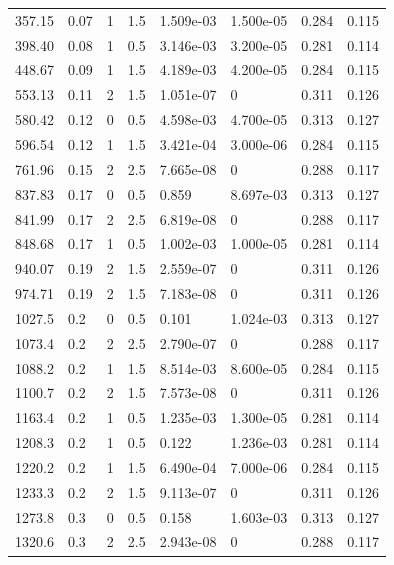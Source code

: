 \documentclass[preview]{standalone}
\begin{document}
{{\begin{tabular}{L{1.2cm}C{1.2cm} C{0.3cm}C{0.5cm} C{1.4cm}C{1.4cm} C{1.4cm}C{1.4cm}}
  357.15  &  0.07  & 1     & 1.5 &  1.509e-03  & 1.500e-05  & 0.284 &  0.115   \\ 
  398.40  &  0.08  & 1     & 0.5 &  3.146e-03  & 3.200e-05  & 0.281 &  0.114   \\ 
  448.67  &  0.09  & 1     & 1.5 &  4.189e-03  & 4.200e-05  & 0.284 &  0.115   \\ 
  553.13  &  0.11  & 2     & 1.5 &  1.051e-07  & 0  & 0.311 &  0.126   \\ 
  580.42  &  0.12  & 0     & 0.5 &  4.598e-03  & 4.700e-05  & 0.313 &  0.127   \\ 
  596.54  &  0.12  & 1     & 1.5 &  3.421e-04  & 3.000e-06  & 0.284 &  0.115   \\ 
  761.96  &  0.15  & 2     & 2.5 &  7.665e-08  & 0  & 0.288 &  0.117   \\ 
  837.83  &  0.17  & 0     & 0.5 &  0.859  & 8.697e-03  & 0.313 &  0.127   \\ 
  841.99  &  0.17  & 2     & 2.5 &  6.819e-08  & 0  & 0.288 &  0.117   \\ 
  848.68  &  0.17  & 1     & 0.5 &  1.002e-03  & 1.000e-05  & 0.281 &  0.114   \\ 
  940.07  &  0.19  & 2     & 1.5 &  2.559e-07  & 0  & 0.311 &  0.126   \\ 
  974.71  &  0.19  & 2     & 1.5 &  7.183e-08  & 0  & 0.311 &  0.126   \\ 
  1027.5  &   0.2  & 0     & 0.5 &  0.101  & 1.024e-03  & 0.313 &  0.127   \\ 
  1073.4  &   0.2  & 2     & 2.5 &  2.790e-07  & 0  & 0.288 &  0.117   \\ 
  1088.2  &   0.2  & 1     & 1.5 &  8.514e-03  & 8.600e-05  & 0.284 &  0.115   \\ 
  1100.7  &   0.2  & 2     & 1.5 &  7.573e-08  & 0  & 0.311 &  0.126   \\ 
  1163.4  &   0.2  & 1     & 0.5 &  1.235e-03  & 1.300e-05  & 0.281 &  0.114   \\ 
  1208.3  &   0.2  & 1     & 0.5 &  0.122  & 1.236e-03  & 0.281 &  0.114   \\ 
  1220.2  &   0.2  & 1     & 1.5 &  6.490e-04  & 7.000e-06  & 0.284 &  0.115   \\ 
  1233.3  &   0.2  & 2     & 1.5 &  9.113e-07  & 0  & 0.311 &  0.126   \\ 
  1273.8  &   0.3  & 0     & 0.5 &  0.158  & 1.603e-03  & 0.313 &  0.127   \\ 
  1320.6  &   0.3  & 2     & 2.5 &  2.943e-08  & 0  & 0.288 &  0.117   \\ 

\end{tabular}}}
\end{document}
